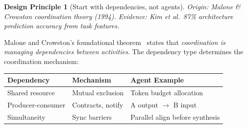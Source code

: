 \documentclass{article}
\newtheorem{principle}{Design Principle}
\begin{document}
%

\begin{principle}[Start with dependencies, not agents]
\emph{Origin}: Malone \& Crowston coordination theory (1994).
\emph{Evidence}: Kim et al.\ 87\% architecture prediction accuracy from task features.
\end{principle}

Malone and Crowston's foundational theorem~\citep{malone1994interdisciplinary} states
that \emph{coordination is managing dependencies between activities}. The dependency
type determines the coordination mechanism:

\begin{center}
\small
\begin{tabular}{@{} l p{2.2cm} p{2.8cm} @{}}
\toprule
\textbf{Dependency} & \textbf{Mechanism} & \textbf{Agent Example} \\
\midrule
Shared resource & Mutual exclusion & Token budget allocation \\
Producer-consumer & Contracts, notify & A output $\to$ B input \\
Simultaneity & Sync barriers & Parallel align before synthesis \\
\bottomrule
\end{tabular}
\end{center}
\end{document}
